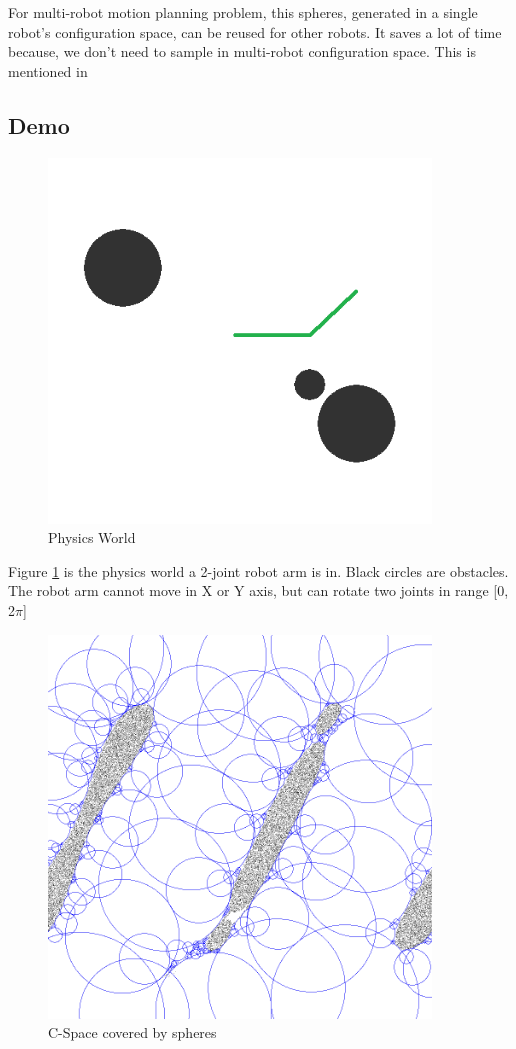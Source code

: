 \documentclass{article}
\begin{document}
      For multi-robot motion planning problem, this spheres, generated in a single robot's configuration space, can be reused for other robots. It saves a lot of time because, we don't need to sample in multi-robot configuration space. This is mentioned in \cite{Bialkowski2013} 

  \subsection{Demo}
    \begin{figure}[ht]
      \centering
      \includegraphics[width=4in]{PhysicSpace_Origin.PNG}
      \caption{Physics World}
      \label{fig:PhysicsWorld}
    \end{figure}

    Figure \ref{fig:PhysicsWorld} is the physics world a 2-joint robot arm is in. Black circles are obstacles. The robot arm cannot move in X or Y axis, but can rotate two joints in range [0, 2$\pi$]

    \begin{figure}[ht]
      \centering
      \includegraphics[width=4in]{CSpace.PNG}
      \caption{C-Space covered by spheres}
      \label{fig:C-Space}
    \end{figure}
\end{document}
